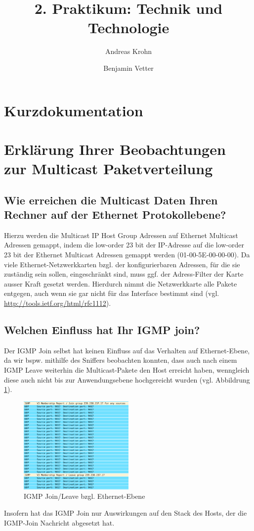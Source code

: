\documentclass[a4paper,10pt]{article}
\title{2. Praktikum: Technik und Technologie}
\author{Andreas Krohn \and Benjamin Vetter}
\begin{document}
\maketitle

\section{Kurzdokumentation}

\section{Erklärung Ihrer Beobachtungen zur Multicast Paketverteilung}

\subsection{Wie erreichen die Multicast Daten Ihren Rechner auf der Ethernet Protokollebene?}

Hierzu werden die Multicast IP Host Group Adressen auf Ethernet Multicast Adressen gemappt,
indem die low-order 23 bit der IP-Adresse auf die low-order 23 bit der Ethernet Multicast Adressen gemappt werden (01-00-5E-00-00-00).
Da viele Ethernet-Netzwerkkarten bzgl. der konfigurierbaren Adressen, für die sie zuständig sein sollen, eingeschränkt sind, muss ggf. der Adress-Filter der Karte ausser Kraft gesetzt werden.
Hierdurch nimmt die Netzwerkkarte alle Pakete entgegen, auch wenn sie gar nicht für das Interface bestimmt sind (vgl. \url{http://tools.ietf.org/html/rfc1112}).

\subsection{Welchen Einfluss hat Ihr IGMP join?}

Der IGMP Join selbst hat keinen Einfluss auf das Verhalten auf Ethernet-Ebene,
da wir bspw. mithilfe des Sniffers beobachten konnten, 
dass auch nach einem IGMP Leave weiterhin die Multicast-Pakete den Host erreicht haben,
wenngleich diese auch nicht bis zur Anwendungsebene hochgereicht wurden (vgl. Abbildrung \ref{multicast_after_leave}).

\begin{figure}
	\begin{center}
		\includegraphics[width=0.5\textwidth]{multicast_after_leave.png}
	\end{center}

	\caption{IGMP Join/Leave bzgl. Ethernet-Ebene}

	\label{multicast_after_leave}
\end{figure}

Insofern hat das IGMP Join nur Auswirkungen auf den Stack des Hosts, 
der die IGMP-Join Nachricht abgesetzt hat.
\end{document}
